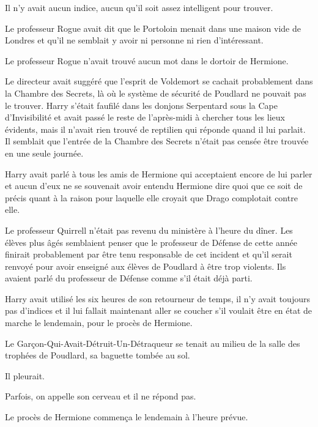 Il n'y avait aucun indice, aucun qu'il soit assez intelligent pour trouver.

Le professeur Rogue avait dit que le Portoloin menait dans une maison vide de Londres et qu'il ne semblait y avoir ni personne ni rien d'intéressant.

Le professeur Rogue n'avait trouvé aucun mot dans le dortoir de Hermione.

Le directeur avait suggéré que l'esprit de Voldemort se cachait probablement dans la Chambre des Secrets, là où le système de sécurité de Poudlard ne pouvait pas le trouver. Harry s'était faufilé dans les donjons Serpentard sous la Cape d'Invisibilité et avait passé le reste de l'après-midi à chercher tous les lieux évidents, mais il n'avait rien trouvé de reptilien qui réponde quand il lui parlait. Il semblait que l'entrée de la Chambre des Secrets n'était pas censée être trouvée en une seule journée.

Harry avait parlé à tous les amis de Hermione qui acceptaient encore de lui parler et aucun d'eux ne se souvenait avoir entendu Hermione dire quoi que ce soit de précis quant à la raison pour laquelle elle croyait que Drago complotait contre elle.

Le professeur Quirrell n'était pas revenu du ministère à l'heure du dîner. Les élèves plus âgés semblaient penser que le professeur de Défense de cette année finirait probablement par être tenu responsable de cet incident et qu'il serait renvoyé pour avoir enseigné aux élèves de Poudlard à être trop violents. Ils avaient parlé du professeur de Défense comme s'il était déjà parti.

Harry avait utilisé les six heures de son retourneur de temps, il n'y avait toujours pas d'indices et il lui fallait maintenant aller se coucher s'il voulait être en état de marche le lendemain, pour le procès de Hermione.

Le Garçon-Qui-Avait-Détruit-Un-Détraqueur se tenait au milieu de la salle des trophées de Poudlard, sa baguette tombée au sol.

Il pleurait.

Parfois, on appelle son cerveau et il ne répond pas.

Le procès de Hermione commença le lendemain à l'heure prévue.
